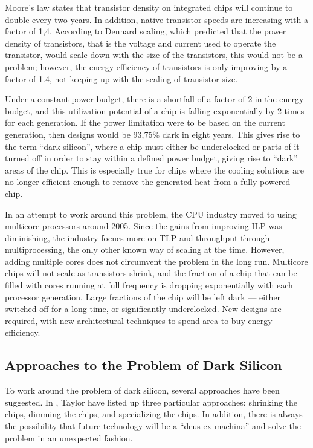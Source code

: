 Moore's law states that transistor density on integrated chips will continue to double every
two years. In addition, native transistor speeds are increasing with a factor of 1,4.
According to Dennard scaling, which predicted that the power density of transistors, that
is the voltage and current used to operate the transistor, would scale down with the
size of the transistors, this would not be a problem; however, the energy efficiency
of transistors is only improving by a factor of 1.4, not keeping up with the scaling
of transistor size.

Under a constant power-budget, there is a shortfall of a factor of 2 in the energy budget,
and this utilization potential of a chip is falling exponentially by 2 times for each generation.
If the power limitation were to be based on the current generation, then designs would be 93,75\% dark in eight years.
This gives rise to the term ``dark silicon'', where a chip must either be underclocked or parts of
it turned off in order to stay within a defined power budget, giving rise to ``dark'' areas of the chip.
This is especially true for chips where the cooling solutions are no longer efficient enough to remove
the generated heat from a fully powered chip.

In an attempt to work around this problem, the CPU industry moved to using multicore processors around 2005.
Since the gains from improving ILP was diminishing, the industry focues more on TLP and throughput through multiprocessing, the only other known way of scaling at the time. \cite{computer_architecture} 
However, adding multiple cores does not circumvent the problem in the long run.
Multicore chips will not scale as transistors shrink, and the fraction of a chip that can be filled with cores running at full frequency is dropping exponentially with each processor generation. 
Large fractions of the chip will be left dark --- either switched off for a long time, or significantly underclocked.
New designs are required, with new architectural techniques to spend area to buy energy efficiency. \cite{dark-silicon}

\subsection{Approaches to the Problem of Dark Silicon}
\label{sec:taylor}

To work around the problem of dark silicon, several approaches have been suggested.
In \cite{dark-silicon}, Taylor have listed up three particular approaches: shrinking the chips, dimming the chips, and specializing the chips.
In addition, there is always the possibility that future technology will be a ``deus ex machina'' and solve the problem in
an unexpected fashion.

